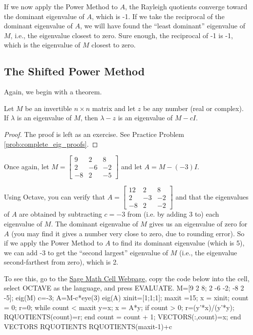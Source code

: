 \documentclass{ximera}
\begin{document}
If we now apply the Power Method to $A$, the Rayleigh quotients converge toward the dominant eigenvalue of $A$, which is -1.  If we take the reciprocal of the dominant eigenvalue of $A$, we will have found the ``least dominant'' eigenvalue of $M$, i.e., the eigenvalue closest to zero.  Sure enough, the reciprocal of -1 is -1, which is the eigenvalue of $M$ closest to zero.


\subsection*{The Shifted Power Method}
Again, we begin with a theorem.

\begin{theorem}\label{th:eig_shifted}
Let $M$ be an invertible $n \times n$ matrix and let $z$ be any number (real or complex).  If $\lambda$ is an eigenvalue of $M$, then $\lambda - z$ is an eigenvalue of $M - cI$.
\end{theorem}

\begin{proof}
The proof is left as an exercise.  See Practice Problem \ref{prob:complete_eig_proofs}.
\end{proof}

Once again, let $M=\left[ \begin{array}{rrr}
9 & 2 & 8 \\
2 & -6 & -2 \\
-8 & 2 & -5
\end{array}\right]$ and let $A=M - (-3)I$.

Using Octave, you can verify that $A=\left[ \begin{array}{rrr}
12 & 2 & 8 \\
2 & -3 & -2 \\
-8 & 2 & -2
\end{array}\right]$ and that the eigenvalues of $A$ are obtained by subtracting $c=-3$ from (i.e. by adding 3 to) each eigenvalue of $M$.  The dominant eigenvalue of $M$ gives us an eigenvalue of zero for $A$ (you may find it gives a number very close to zero, due to rounding error).  So if we apply the Power Method to $A$ to find its dominant eigenvalue (which is 5), we can add -3 to get the ``second largest'' eigenvalue of $M$ (i.e., the eigenvalue second-farthest from zero), which is 2.

To see this, go to the \href{https://sagecell.sagemath.org/}{Sage Math Cell Webpage}, copy the code below into the cell, select OCTAVE as the language, and press EVALUATE.
M=[9 2 8; 2 -6 -2; -8 2 -5];
eig(M)
c=-3;
A=M-c*eye(3) %
eig(A)
xinit=[1;1;1]; %
maxit =15; %
x = xinit;
count = 0;
r=0;
    while count < maxit
    y=x;
    x = A*y;
        if count > 0; 
        r=(y'*x)/(y'*y);
        RQUOTIENTS(count)=r;
        end
    count = count + 1;
    VECTORS(:,count)=x;
end
VECTORS
RQUOTIENTS
RQUOTIENTS(maxit-1)+c
\end{document}
